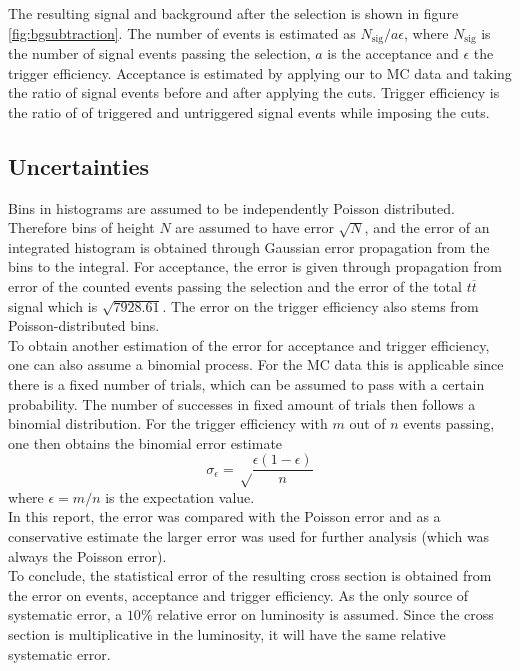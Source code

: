 \documentclass[11pt,a4paper]{article}
\begin{document}
The resulting signal and background after the selection is shown in figure \ref{fig:bgsubtraction}.
The number of events is estimated as $N_\text{sig} / a \epsilon $, where $N_\text{sig}$ is the number of signal events passing the selection, $a$ is the acceptance and $\epsilon$ the trigger efficiency. Acceptance is estimated by applying our to MC data and taking the ratio of signal events before and after applying the cuts. Trigger efficiency is the ratio of of triggered and untriggered signal events while imposing the cuts. 

\subsection{Uncertainties}
Bins in histograms are assumed to be independently Poisson distributed. Therefore bins of height $N$ are assumed to have error $\sqrt{N}$, and the error of an integrated histogram is obtained through Gaussian error propagation from the bins to the integral. 
For acceptance, the error is given through propagation from error of the counted events passing the selection and the error of the total $t \overline{t}$ signal which is $\sqrt{7928.61}$. The error on the trigger efficiency also stems from Poisson-distributed bins.
\\ 
To obtain another estimation of the error for acceptance and trigger efficiency, one can also assume a binomial process. For the MC data this is applicable since there is a fixed number of trials, which can be assumed to pass with a certain probability. The number of successes in fixed amount of trials then follows a binomial distribution. For the trigger efficiency with $m$ out of $n$ events passing, one then obtains the binomial error estimate
\begin{equation}
	\sigma_\epsilon = \sqrt \frac{\epsilon(1-\epsilon)}{n}
\end{equation}
where $\epsilon = m/n$ is the expectation value. 
\\
In this report, the error was compared with the Poisson error and as a conservative estimate the larger error was used for further analysis (which was always the Poisson error). \\
To conclude, the statistical error of the resulting cross section is obtained from the error on events, acceptance and trigger efficiency.  
As the only source of systematic error, a $10\%$ relative error on luminosity is assumed. Since the cross section is multiplicative in the luminosity, it will have the same relative systematic error.
\end{document}
